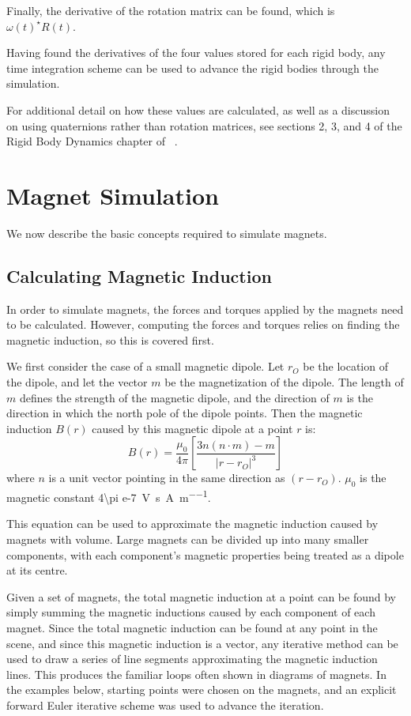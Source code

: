 \documentclass[tog]{acmsiggraph}
\begin{document}
Finally, the derivative of the rotation matrix can be found, which is $\omega(t)^{\star}R(t)$.

Having found the derivatives of the four values stored for each rigid body, any time integration scheme can be used to advance the rigid bodies through the simulation.

For additional detail on how these values are calculated, as well as a discussion on using quaternions rather than rotation matrices, see sections 2, 3, and 4 of the Rigid Body Dynamics chapter of ~\cite{pixarnotes}.

\section{Magnet Simulation}

We now describe the basic concepts required to simulate magnets.

\subsection{Calculating Magnetic Induction}

In order to simulate magnets, the forces and torques applied by the magnets need to be calculated. However, computing the forces and torques relies on finding the magnetic induction, so this is covered first.

We first consider the case of a small magnetic dipole. Let $r_O$ be the location of the dipole, and let the vector $m$ be the magnetization of the dipole. The length of $m$ defines the strength of the magnetic dipole, and the direction of $m$ is the direction in which the north pole of the dipole points. Then the magnetic induction $B(r)$ caused by this magnetic dipole at a point $r$ is:
\begin{equation}
B(r) = \frac{\mu_0}{4\pi}\left[\frac{3n(n\cdot m) - m}{\left|r - r_O\right|^3}\right]
\end{equation}
where $n$ is a unit vector pointing in the same direction as $(r - r_O)$. $\mu_0$ is the magnetic constant \SI[per-mode=fraction]{4\pi e-7}{\volt \second \per \ampere \per \metre}.

This equation can be used to approximate the magnetic induction caused by magnets with volume. Large magnets can be divided up into many smaller components, with each component's magnetic properties being treated as a dipole at its centre.

Given a set of magnets, the total magnetic induction at a point can be found by simply summing the magnetic inductions caused by each component of each magnet. Since the total magnetic induction can be found at any point in the scene, and since this magnetic induction is a vector, any iterative method can be used to draw a series of line segments approximating the magnetic induction lines. This produces the familiar loops often shown in diagrams of magnets. In the examples below, starting points were chosen on the magnets, and an explicit forward Euler iterative scheme was used to advance the iteration.
\end{document}
